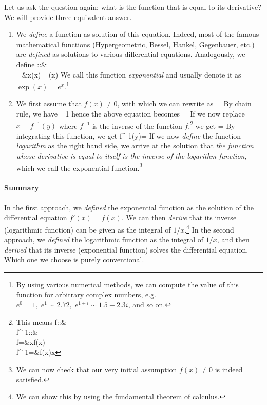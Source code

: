 Let us ask the question again: what is the function that is equal to its derivative? We will provide three equivalent answer.
\begin{enumerate}
	\item We \emph{define} a function as solution of this equation. Indeed, most of the famous mathematical functions (Hypergeometric, Bessel, Hankel, Gegenbauer, etc.) are \emph{defined} as solutions to various differential equations. Analogously, we define
\bea 
\exp::{}&\C\to\C\\
\exp={}&x\to \exp(x) =\exp(x)
\eea 
We call this function \emph{exponential} and usually denote it as \mbox{$\exp(x)=e^x$}.\footnote{By using various numerical methods, we can compute the value of this function for arbitrary complex numbers, e.g. $e^{0}=1,\;e^1\sim 2.72,\;e^{1+i}\sim1.5+2.3i$, and so on.}

	\item We first assume that $f(x)\ne 0$, with which we can rewrite  as
\be 
{}=
\ee 
By chain rule, we have
\be 
{}=1
\ee 
hence the above equation becomes
\be 
{}=
\ee 
If we now replace $x=f^{-1}(y)$ where $f^{-1}$ is the inverse of the function $f$,\footnote{This means
\bea 
f::{}&\C\to\C\\
f^{-1}::{}&\C\to\C\\
f={}&x\to f(x)\\
f^{-1}={}&f(x)\to x
\eea 
} we get
\be 
{}=
\ee 
By integrating this function, we get
\be 
f^{-1}(y)=\int{}
\ee 
If we now \emph{define} the function \emph{logarithm} as the right hand side, we arrive at the solution that \emph{the function whose derivative is equal to itself is the inverse of the logarithm function}, which we call the exponential function.\footnote{We can now check that our very initial assumption $f(x)\ne 0$ is indeed satisfied.}
\end{enumerate}

\paragraph{Summary} In the first approach, we \emph{defined} the exponential function as the solution of the differential equation $f'(x)=f(x)$. We can then \emph{derive} that its inverse (logarithmic function) can be given as the integral of $1/x$.\footnote{We can show this by using the fundamental theorem of calculus.} In the second approach, we \emph{defined} the logarithmic function as the integral of $1/x$, and then \emph{derived} that its inverse (exponential function) solves the differential equation. Which one we choose is purely conventional.

